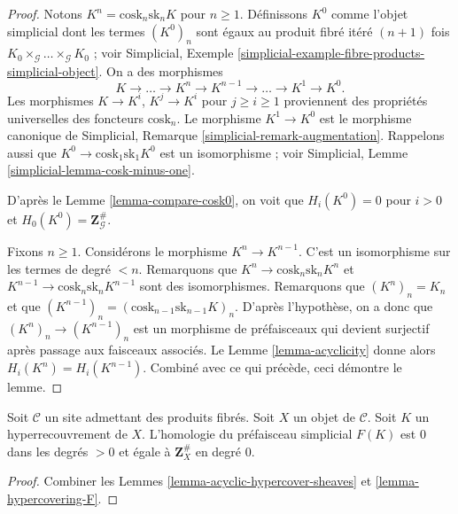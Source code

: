 \begin{proof}
Notons $K^n = \text{cosk}_n \text{sk}_n K$ pour $n \geq 1$.
Définissons $K^0$ comme l'objet simplicial dont les termes
$(K^0)_n$ sont égaux au produit fibré itéré $(n + 1)$ fois
$K_0 \times_\mathcal{G} \ldots \times_\mathcal{G} K_0$ ;
voir Simplicial,
Exemple \ref{simplicial-example-fibre-products-simplicial-object}.
On a des morphismes
$$
K \longrightarrow \ldots \to K^n \to K^{n - 1} \to \ldots \to K^1 \to K^0.
$$
Les morphismes $K \to K^i$, $K^j \to K^i$ pour $j \geq i \geq 1$ proviennent
des propriétés universelles des foncteurs $\text{cosk}_n$.
Le morphisme $K^1 \to K^0$ est le morphisme canonique
de
Simplicial, Remarque \ref{simplicial-remark-augmentation}.
Rappelons aussi que $K^0 \to \text{cosk}_1 \text{sk}_1 K^0$
est un isomorphisme ; voir
Simplicial, Lemme \ref{simplicial-lemma-cosk-minus-one}.

\medskip\noindent
D'après le Lemme \ref{lemma-compare-cosk0}, on voit que
$H_i(K^0) = 0$ pour $i > 0$ et $H_0(K^0) = \mathbf{Z}_\mathcal{G}^\#$.

\medskip\noindent
Fixons $n \geq 1$. Considérons le morphisme $K^n \to K^{n - 1}$.
C'est un isomorphisme sur les termes de degré $< n$.
Remarquons que $K^n \to \text{cosk}_n \text{sk}_n K^n$ et
$K^{n - 1} \to \text{cosk}_n \text{sk}_n K^{n - 1}$
sont des isomorphismes. Remarquons que $(K^n)_n = K_n$ et
que $(K^{n - 1})_n = (\text{cosk}_{n - 1} \text{sk}_{n - 1} K)_n$.
D'après l'hypothèse, on a donc que $(K^n)_n \to (K^{n - 1})_n$
est un morphisme de préfaisceaux qui devient surjectif après
passage aux faisceaux associés. Le Lemme \ref{lemma-acyclicity} donne alors
$H_i(K^n) = H_i(K^{n - 1})$.
Combiné avec ce qui précède, ceci démontre le lemme.
\end{proof}

\begin{lemma}
\label{lemma-hypercovering-acyclic}
Soit $\mathcal{C}$ un site admettant des produits fibrés.
Soit $X$ un objet de $\mathcal{C}$.
Soit $K$ un hyperrecouvrement de $X$.
L'homologie du préfaisceau simplicial $F(K)$ est
$0$ dans les degrés $> 0$ et égale à $\mathbf{Z}_X^\#$
en degré $0$.
\end{lemma}

\begin{proof}
Combiner les Lemmes \ref{lemma-acyclic-hypercover-sheaves}
et \ref{lemma-hypercovering-F}.
\end{proof}












